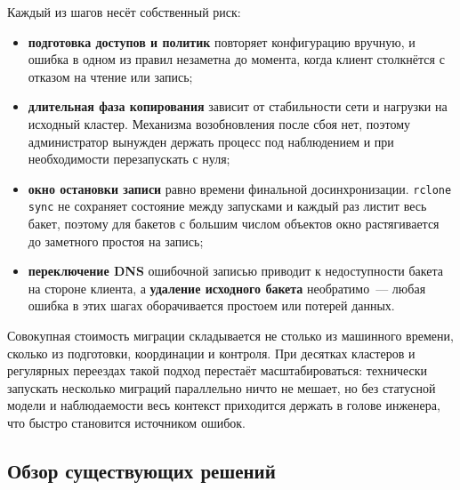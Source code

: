 Каждый из шагов несёт собственный риск:
\begin{itemize}
    \item \textbf{подготовка доступов и политик} повторяет конфигурацию вручную, и ошибка в одном из правил незаметна до момента, когда клиент столкнётся с отказом на чтение или запись;
    \item \textbf{длительная фаза копирования} зависит от стабильности сети и нагрузки на исходный кластер. Механизма возобновления после сбоя нет, поэтому администратор вынужден держать процесс под наблюдением и при необходимости перезапускать с нуля;
    \item \textbf{окно остановки записи} равно времени финальной досинхронизации. \texttt{rclone sync} не сохраняет состояние между запусками и каждый раз листит весь бакет, поэтому для бакетов с большим числом объектов окно растягивается до заметного простоя на запись;
    \item \textbf{переключение DNS} ошибочной записью приводит к недоступности бакета на стороне клиента, а \textbf{удаление исходного бакета} необратимо~--- любая ошибка в этих шагах оборачивается простоем или потерей данных.
\end{itemize}

Совокупная стоимость миграции складывается не столько из машинного времени, сколько из подготовки, координации и контроля.
При десятках кластеров и регулярных переездах такой подход перестаёт масштабироваться: технически запускать несколько миграций параллельно ничто не мешает, но без статусной модели и наблюдаемости весь контекст приходится держать в голове инженера, что быстро становится источником ошибок.

\subsection{Обзор существующих решений}\label{subsec:rclone-review}

